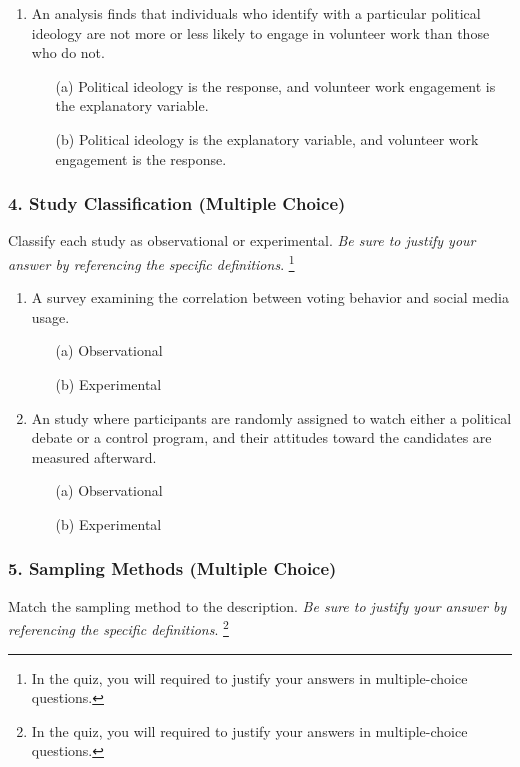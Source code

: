 \documentclass{article}
\begin{document}
\begin{enumerate}
    \item An analysis finds that individuals who identify with a particular political ideology are not more or less likely to engage in volunteer work than those who do not.
    \begin{itemize}
        \item[(a)] Political ideology is the response, and volunteer work engagement is the explanatory variable.
        \item[(b)] Political ideology is the explanatory variable, and volunteer work engagement is the response.
    \end{itemize}
\end{enumerate}

\subsubsection*{4. Study Classification (Multiple Choice)}
Classify each study as observational or experimental. \emph{Be sure to justify your answer by referencing the specific definitions}. \footnote{In the quiz, you will required to justify your answers in multiple-choice questions.}

\begin{enumerate}
    \item A survey examining the correlation between voting behavior and social media usage.
    \begin{itemize}
    \item [(a)] Observational
    \item [(b)] Experimental
\end{itemize}
    \item An study where participants are randomly assigned to watch either a political debate or a control program, and their attitudes toward the candidates are measured afterward.
    \begin{itemize}
    \item [(a)] Observational
    \item [(b)] Experimental
\end{itemize}
\end{enumerate}


\subsubsection*{5. Sampling Methods (Multiple Choice)}
Match the sampling method to the description. \emph{Be sure to justify your answer by referencing the specific definitions}. \footnote{In the quiz, you will required to justify your answers in multiple-choice questions.}
\end{document}
